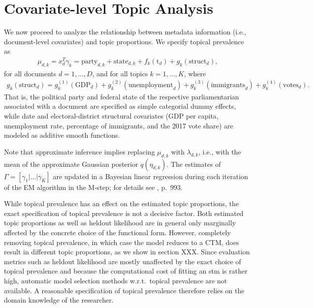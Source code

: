 \section{Covariate-level Topic Analysis}

We now proceed to analyze the relationship between metadata information (i.e., document-level covariates) and topic proportions. We specify topical prevalence as 
\begin{align}
\mu_{d,k} = x_d^T \gamma_k= \text{party}_{d,k} + \text{state}_{d,k} + f_k(\text{t}_d) + g_k(\text{struct}_d), \label{prevalence}
\end{align} 
for all documents $d = 1,\dots,D$, and for all topics $k = 1,\dots,K$, where 
\begin{align*}
g_k(\text{struct}_d) = g_{k}^{(1)}(\text{GDP}_d)+g_{k}^{(2)}(\text{unemployment}_d)+g_{k}^{(3)}(\text{immigrants}_d)+g_{k}^{(4)}(\text{votes}_d). 
\end{align*} 
That is, the political party and federal state of the respective parliamentarian associated with a document are specified as simple categorial dummy effects, while date and electoral-district structural covariates (GDP per capita, unemployment rate, percentage of immigrants, and the 2017 vote share) are modeled as additive smooth functions.

Note that approximate inference implies replacing $\mu_{d,k}$ with $\lambda_{d,k}$, i.e., with the mean of the approximate Gaussian posterior $q(\eta_{d,k})$. The estimates of $\Gamma = [\gamma_1 | \dots | \gamma_K]$ are updated in a Bayesian linear regression during each iteration of the EM algorithm in the M-step; for details see \cite{roberts2013structural}, p.\ 993.

While topical prevalence has an effect on the estimated topic proportions, the exact specification of topical prevalence is not a decisive factor. Both estimated topic proportions as well as heldout likelihood are in general only marginally affected by the concrete choice of the functional form. However, completely removing topical prevalence, in which case the model reduces to a CTM, does result in different topic proportions, as we show in section XXX. Since evaluation metrics such as heldout likelihood are mostly unaffected by the exact choice of topical prevalence and because the computational cost of fitting an stm is rather high, automatic model selection methods w.r.t.\ topical prevalence are not available. A reasonable specification of topical prevalence therefore relies on the domain knowledge of the researcher.

